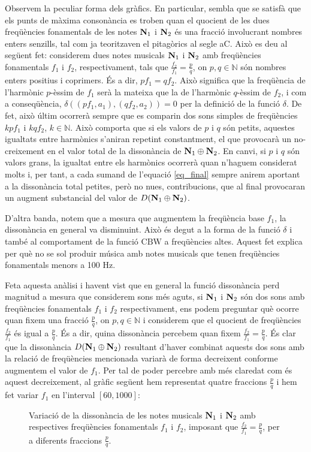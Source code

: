 \documentclass{article}
\theoremstyle{math}
\theoremstyle{TheoremNum}
\newcommand{\0}{\ensuremath{\vb{0}}}
\newcommand{\N}{\ensuremath{\vb{N}}}
\newcommand{\NN}{\ensuremath{\mathbb{N}}} %
\begin{document}
Observem la peculiar forma dels gràfics. En particular, sembla que se satisfà que els punts de màxima consonància es troben quan el quocient de les dues freqüències fonamentals de les notes $\N_1$ i $\N_2$ és una fracció involucrant nombres enters senzills, tal com ja teoritzaven el pitagòrics al segle \MakeUppercase{} aC. Això es deu al següent fet: considerem dues notes musicals $\N_1$ i $\N_2$ amb freqüències fonamentals $f_1$ i $f_2$, respectivament, tals que $\frac{f_2}{f_1}=\frac{p}{q}$, on $p,q\in\NN$ són nombres enters positius i coprimers. És a dir, $pf_1=qf_2$. Això significa que la freqüència de l'harmònic $p$-èssim de $f_1$ serà la mateixa que la de l'harmònic $q$-èssim de $f_2$, i com a conseqüència, $\delta((pf_1,a_1),(qf_2,a_2))=0$ per la definició de la funció $\delta$. De fet, això últim ocorrerà sempre que es comparin dos sons simples de freqüències $kpf_1$ i $kqf_2$, $k\in\NN$. Això comporta que si els valors de $p$ i $q$ són petits, aquestes igualtats entre harmònics s'aniran repetint constantment, el que provocarà un no-creixement en el valor total de la dissonància de $\N_1\oplus\N_2$. En canvi, si $p$ i $q$ són valors grans, la igualtat entre els harmònics ocorrerà quan n'haguem considerat molts i, per tant, a cada sumand de l'equació \eqref{eq_final} sempre anirem aportant a la dissonància total petites, però no nu\lgem es, contribucions, que al final provocaran un augment substancial del valor de $D(\N_1\oplus\N_2)$.\par
D'altra banda, notem que a mesura que augmentem la freqüència base $f_1$, la dissonància en general va disminuint. Això és degut a la forma de la funció $\delta$ i també al comportament de la funció $\text{CBW}$ a freqüències altes. Aquest fet explica per què no se sol produir música amb notes musicals que tenen freqüències fonamentals menors a 100 Hz.\par Feta aquesta anàlisi i havent vist que en general la funció dissonància perd magnitud a mesura que considerem sons més aguts, si $\N_1$ i $\N_2$ són dos sons amb freqüències fonamentals $f_1$ i $f_2$ respectivament, ens podem preguntar què ocorre quan fixem una fracció $\frac{p}{q}$, on $p,q\in\NN$ i considerem que el quocient de freqüències $\frac{f_2}{f_1}$ és igual a $\frac{p}{q}$. És a dir, quina dissonància percebem quan fixem $\frac{f_2}{f_1}=\frac{p}{q}$. És clar que la dissonància $D(\N_1\oplus\N_2)$ resultant d'haver combinat aquests dos sons amb la relació de freqüències mencionada variarà de forma decreixent conforme augmentem el valor de $f_1$. Per tal de poder percebre amb més claredat com és aquest decreixement, al gràfic següent hem representat quatre fraccions $\frac{p}{q}$ i hem fet variar $f_1$ en l'interval $[60,1000]$:
\begin{figure}[ht]
    \centering
    
    \caption{Variació de la dissonància de les notes musicals $\N_1$ i $\N_2$ amb respectives freqüències fonamentals $f_1$ i $f_2$, imposant que $\frac{f_2}{f_1}=\frac{p}{q}$, per a diferents fraccions $\frac{p}{q}$.}
\end{figure}
\end{document}
